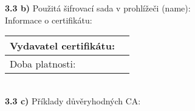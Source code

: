 \documentclass[a4paper,11pt]{article}
\begin{document}
\textbf{3.3 b)} Použitá šifrovací sada v prohlížeči (name): \underline{\hspace{7cm}} \\ 

Informace o certifikátu:\\

\renewcommand\arraystretch{1.3}
\begin{tabular}{|l|r|}
\hline
Vydavatel certifikátu: & \hspace{30em} \\ \hline
Doba platnosti: & \\ \hline
\end{tabular}
\renewcommand\arraystretch{1}
\vspace{0.5cm}\\

{\bf 3.3 c)} Příklady důvěryhodných CA:\\
\end{document}
